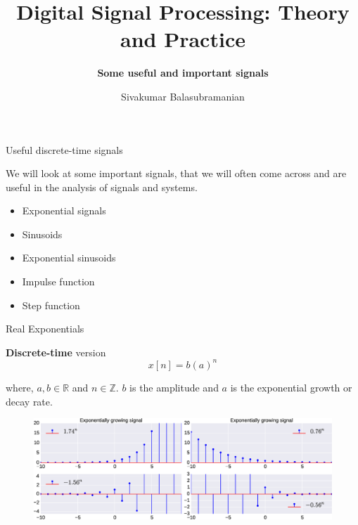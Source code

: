\documentclass{beamer}
\title{Digital Signal Processing: Theory and Practice}
\subtitle{\textbf{Some useful and important signals}}
\author{Sivakumar Balasubramanian}
\institute[Christian Medical College] %
{
  \inst{}%
  Department of Bioengineering\\
  Christian Medical College, Bagayam\\
  Vellore 632002
}
\date{}
\begin{document}
\begin{frame}
  \titlepage
\end{frame}

\begin{frame}[t]{Useful discrete-time signals}

We will look at some important signals, that we will often come across and are useful in the analysis of signals and systems.
\begin{itemize}
\item Exponential signals
\item Sinusoids
\item Exponential sinusoids
\item Impulse function
\item Step function
\end{itemize}

\end{frame}

%
%
%

\begin{frame}[t]{Real Exponentials}

\textbf{Discrete-time} version
\[ x[n] =  b \left(a\right)^n \]

where, $a, b \in \mathbb{R}$ and $n \in \mathbb{Z}$. $b$ is the amplitude and $a$ is the exponential growth or decay rate.

\begin{figure}
\includegraphics[width=\textwidth]{img/disc_exp.eps}
\end{figure}
\end{frame}
\end{document}
